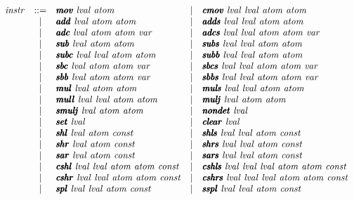 \documentclass{article}
\begin{document}
\[
\begin{array}{rclcl}
  \instr &  ::= & \pmb\imov\ \lval\ \atom
         & \mid & \pmb\icmov\ \lval\ \lval\ \atom\ \atom \\
         & \mid & \pmb\iadd\ \lval\ \atom\ \atom
         & \mid & \pmb\iadds\ \lval\ \lval\ \atom\ \atom \\
         & \mid & \pmb\iadc\ \lval\ \atom\ \atom\ \var
         & \mid & \pmb\iadcs\ \lval\ \lval\ \atom\ \atom\ \var \\
         & \mid & \pmb\isub\ \lval\ \atom\ \atom 
         & \mid & \pmb\isubs\ \lval\ \lval\ \atom\ \atom \\
         & \mid & \pmb\isubc\ \lval\ \lval\ \atom\ \atom
         & \mid & \pmb\isubb\ \lval\ \lval\ \atom\ \atom \\
         & \mid & \pmb\isbc\ \lval\ \atom\ \atom\ \var
         & \mid & \pmb\isbcs\ \lval\ \lval\ \atom\ \atom\ \var \\
         & \mid & \pmb\isbb\ \lval\ \atom\ \atom\ \var
         & \mid & \pmb\isbbs\ \lval\ \lval\ \atom\ \atom\ \var \\
         & \mid & \pmb\imul\ \lval\ \atom\ \atom
         & \mid & \pmb\imuls\ \lval\ \lval\ \atom\ \atom \\
         & \mid & \pmb\imull\ \lval\ \lval\ \atom\ \atom
         & \mid & \pmb\imulj\ \lval\ \atom\ \atom \\
         & \mid & \pmb\ismulj\ \lval\ \atom\ \atom
         & \mid & \pmb\inondet\ \lval \\
         & \mid & \pmb\iset\ \lval
         & \mid & \pmb\iclear\ \lval \\
         & \mid & \pmb\ishl\ \lval\ \atom\ \const
         & \mid & \pmb\ishls\ \lval\ \lval\ \atom\ \const \\
         & \mid & \pmb\ishr\ \lval\ \atom\ \const
         & \mid & \pmb\ishrs\ \lval\ \lval\ \atom\ \const \\
         & \mid & \pmb\isar\ \lval\ \atom\ \const
         & \mid & \pmb\isars\ \lval\ \lval\ \atom\ \const \\
         & \mid & \pmb\icshl\ \lval\ \lval\ \atom\ \atom\ \const
         & \mid & \pmb\icshls\ \lval\ \lval\ \lval\ \atom\ \atom\ \const \\
         & \mid & \pmb\icshr\ \lval\ \lval\ \atom\ \atom\ \const
         & \mid & \pmb\icshrs\ \lval\ \lval\ \lval\ \atom\ \atom\ \const \\
         & \mid & \pmb\ispl\ \lval\ \lval\ \atom\ \const
         & \mid & \pmb\isspl\ \lval\ \lval\ \atom\ \const \\

\end{array}\]
\end{document}
